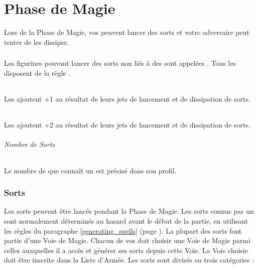 
\hypertarget{magicphase}{\part{Phase de Magie}}

Lors de la Phase de Magie, vos \wizards{} peuvent lancer des sorts et votre adversaire peut tenter de les dissiper.

\section{\wizards}

Les figurines pouvant lancer des sorts non liés à des \boundspells{} sont appelées \wizards{}. Tous les \wizards{} disposent de la règle \channel{}.

\paragraph{\wizardapprentices} 

Les \wizardapprentices{} ajoutent +1 au résultat de leurs jets de lancement et de dissipation de sorts.

\paragraph{\wizardmasters} 

Les \wizardmasters{} ajoutent +2 au résultat de leurs jets de lancement et de dissipation de sorts.

\paragraph{Nombre de Sorts}

Le nombre de \learnedspells{} que connaît un \wizard{} est précisé dans son profil.

\section{Sorts}

Les sorts peuvent être lancés pendant la Phase de Magie. Les sorts connus par un \wizard{} sont normalement déterminés au hasard avant le début de la partie, en utilisant les règles du paragraphe \ref{generating_spells} (page \pageref{generating_spells}). La plupart des sorts font partie d'une Voie de Magie. Chacun de vos \wizards{} doit choisir une Voie de Magie parmi celles auxquelles il a accès et générer ses sorts depuis cette Voie. La Voie choisie doit être inscrite dans la Liste d'Armée. Les sorts sont divisés en trois catégories :

